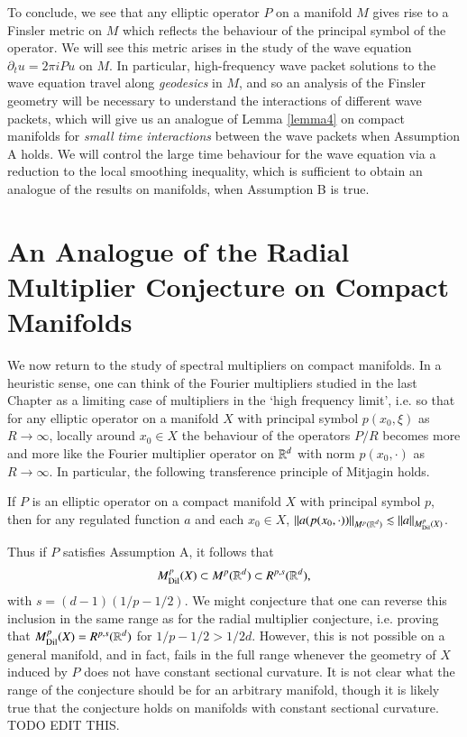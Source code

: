 To conclude, we see that any elliptic operator $P$ on a manifold $M$ gives rise to a Finsler metric on $M$ which reflects the behaviour of the principal symbol of the operator. We will see this metric arises in the study of the wave equation $\partial_t u = 2 \pi i P u$ on $M$. In particular, high-frequency wave packet solutions to the wave equation travel along \emph{geodesics} in $M$, and so an analysis of the Finsler geometry will be necessary to understand the interactions of different wave packets, which will give us an analogue of Lemma \ref{lemma4} on compact manifolds for \emph{small time interactions} between the wave packets when Assumption A holds. We will control the large time behaviour for the wave equation via a reduction to the local smoothing inequality, which is sufficient to obtain an analogue of the results \cite{HeoandNazarovandSeeger} on manifolds, when Assumption B is true.

\section{An Analogue of the Radial Multiplier Conjecture on Compact Manifolds}

We now return to the study of spectral multipliers on compact manifolds. In a heuristic sense, one can think of the Fourier multipliers studied in the last Chapter as a limiting case of multipliers in the `high frequency limit', i.e. so that for any elliptic operator on a manifold $X$ with principal symbol $p(x_0,\xi)$ as $R \to \infty$, locally around $x_0 \in X$ the behaviour of the operators $P/R$ becomes more and more like the Fourier multiplier operator on $\operatorname{\mathbb{R}}^d$ with norm $p(x_0,\cdot)$ as $R \to \infty$. In particular, the following transference principle of Mitjagin \cite{Mitjagin} holds.

\begin{theorem}
  If $P$ is an elliptic operator on a compact manifold $X$ with principal symbol $p$, then for any regulated function $a$ and each $x_0 \in X$, $\| a(p(x_0,\cdot)) \|_{M^p(\operatorname{\mathbb{R}}^d)} \lesssim \| a \|_{M^p_{\text{Dil}}(X)}$.
\end{theorem}

Thus if $P$ satisfies Assumption A, it follows that
%
\[ M^p_{\text{Dil}}(X) \subset M^p(\operatorname{\mathbb{R}}^d) \subset R^{p,s}(\operatorname{\mathbb{R}}^d), \]
%
with $s = (d-1)(1/p - 1/2)$. We might conjecture that one can reverse this inclusion in the same range as for the radial multiplier conjecture, i.e. proving that $M^p_{\text{Dil}}(X) = R^{p,s}(\operatorname{\mathbb{R}}^d)$ for $1/p - 1/2 > 1/2d$. However, this is not possible on a general manifold, and in fact, fails in the full range whenever the geometry of $X$ induced by $P$ does not have constant sectional curvature. It is not clear what the range of the conjecture should be for an arbitrary manifold, though it is likely true that the conjecture holds on manifolds with constant sectional curvature. TODO EDIT THIS.

